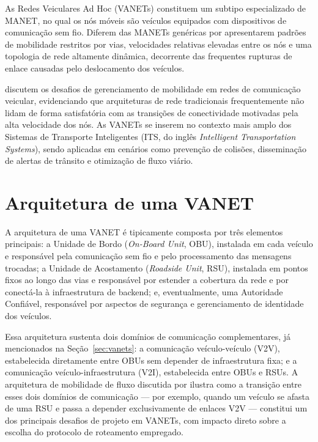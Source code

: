 As Redes Veiculares Ad Hoc (VANETs) constituem um subtipo especializado de MANET, no qual
os nós móveis são veículos equipados com dispositivos de comunicação sem fio. Diferem das
MANETs genéricas por apresentarem padrões de mobilidade restritos por vias, velocidades
relativas elevadas entre os nós e uma topologia de rede altamente dinâmica, decorrente das
frequentes rupturas de enlace causadas pelo deslocamento dos veículos.

 discutem os desafios de gerenciamento de mobilidade em
redes de comunicação veicular, evidenciando que arquiteturas de rede tradicionais
frequentemente não lidam de forma satisfatória com as transições de conectividade
motivadas pela alta velocidade dos nós. As VANETs se inserem no contexto mais amplo dos
Sistemas de Transporte Inteligentes (ITS, do inglês \textit{Intelligent Transportation
Systems}), sendo aplicadas em cenários como prevenção de colisões, disseminação de alertas
de trânsito e otimização de fluxo viário.

\section{Arquitetura de uma VANET}
\label{sec:arquitetura-vanet}

A arquitetura de uma VANET é tipicamente composta por três elementos principais: a Unidade
de Bordo (\textit{On-Board Unit}, OBU), instalada em cada veículo e responsável pela
comunicação sem fio e pelo processamento das mensagens trocadas; a Unidade de Acostamento
(\textit{Roadside Unit}, RSU), instalada em pontos fixos ao longo das vias e responsável por
estender a cobertura da rede e por conectá-la à infraestrutura de backend; e, eventualmente,
uma Autoridade Confiável, responsável por aspectos de segurança e gerenciamento de
identidade dos veículos.

Essa arquitetura sustenta dois domínios de comunicação complementares, já mencionados na
Seção~\ref{sec:vanets}: a comunicação veículo-veículo (V2V), estabelecida diretamente entre
OBUs sem depender de infraestrutura fixa; e a comunicação veículo-infraestrutura (V2I),
estabelecida entre OBUs e RSUs. A arquitetura de mobilidade de fluxo discutida por
 ilustra como a transição entre esses dois domínios de
comunicação — por exemplo, quando um veículo se afasta de uma RSU e passa a depender
exclusivamente de enlaces V2V — constitui um dos principais desafios de projeto em VANETs,
com impacto direto sobre a escolha do protocolo de roteamento empregado.

